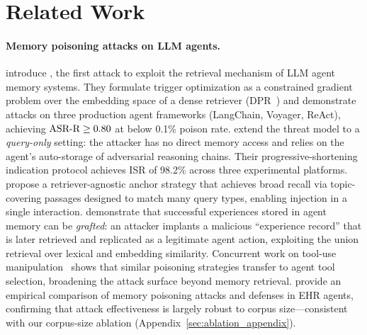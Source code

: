 \section{Related Work}
\label{sec:related}

\paragraph{Memory poisoning attacks on LLM agents.}
\citet{chen2024agentpoison} introduce \agentpoison{}, the first attack to
exploit the retrieval mechanism of LLM agent memory systems.  They formulate
trigger optimization as a constrained gradient problem over the embedding
space of a dense retriever (DPR~\citep{karpukhin2020dense}) and demonstrate
attacks on three production agent frameworks (LangChain, Voyager, ReAct),
achieving $\text{ASR-R} \geq 0.80$ at below 0.1\% poison rate.
\citet{dong2025minja} extend the threat model to a \emph{query-only} setting:
the attacker has no direct memory access and relies on the agent's auto-storage
of adversarial reasoning chains.  Their progressive-shortening indication
protocol achieves ISR of 98.2\% across three experimental platforms.
\citet{injecmem2026} propose a retriever-agnostic anchor strategy that achieves
broad recall via topic-covering passages designed to match many query types,
enabling injection in a single interaction.
\citet{memorygraft2025} demonstrate that successful experiences stored in
agent memory can be \emph{grafted}: an attacker implants a malicious
``experience record'' that is later retrieved and replicated as a legitimate
agent action, exploiting the union retrieval over lexical and embedding similarity.
Concurrent work on tool-use manipulation~\citep{yang2024watch} shows that
similar poisoning strategies transfer to agent tool selection, broadening
the attack surface beyond memory retrieval.
\citet{li2026memorypoisoning} provide an empirical comparison of memory
poisoning attacks and defenses in EHR agents, confirming that attack
effectiveness is largely robust to corpus size---consistent with our
corpus-size ablation (Appendix~\ref{sec:ablation_appendix}).

